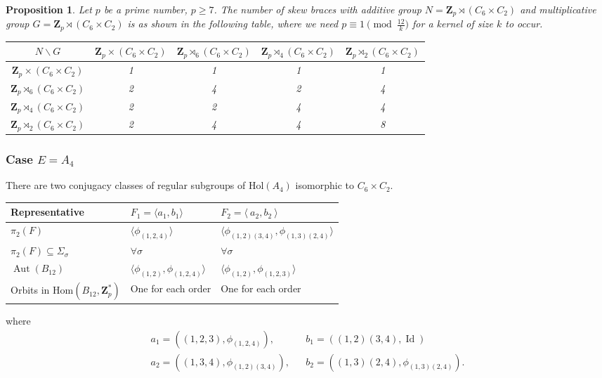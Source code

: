 \documentclass[12pt]{article}
\newtheorem{proposition}[theorem]{Proposition}
\theoremstyle{definition}
\newcommand{\Z}{\mathbf Z}
\newcommand{\Hol}{\mathrm{Hol}}
\newcommand{\Hom}{\mathrm{Hom}}
\newcommand{\Aut}{\operatorname{Aut}}
\newcommand{\Id}{\operatorname{Id}}
\begin{document}
\begin{proposition}
	Let $p$ be a prime number, $p\geq 7$. The number of skew braces with additive group $N=\Z_p \rtimes (C_{6}\times C_2)$ and multiplicative group $G=\Z_p\rtimes (C_6\times C_2)$ is as shown in the following table, where we need $p\equiv 1 \pmod{\frac {12}k}$ for a kernel of size $k$ to occur.
	
	\begin{center}
		\begin{tabular}{|c|c|c|c|c|}
			\hline
			$N \backslash G$ & $\Z_p\times (C_6\times C_2)$ & $\Z_p\rtimes_{6} (C_6\times C_2)$ & $\Z_p\rtimes_{4} (C_6\times C_2)$ & $\Z_p\rtimes_{2} (C_6\times C_2)$ \\
			\hline
			\hline
			$\Z_p\times (C_6\times C_2)$ &1&1&1&1\\
			\hline
			$\Z_p\rtimes_{6} (C_6\times C_2)$ &2&4&2&4\\
			\hline
			$\Z_p\rtimes_{4} (C_6\times C_2)$ &2&2&4&4\\
			\hline
			$\Z_p\rtimes_{2} (C_6\times C_2)$ &2&4&4&8\\
			\hline
			
		\end{tabular}
	\end{center}
\end{proposition}


\subsubsection*{Case $E=A_4$}

There are two conjugacy classes of regular subgroups of $\Hol(A_4)$ isomorphic to $C_6\times C_2$.  

\begin{center}
    \begin{tabular}{|l|l|l|}
    \hline
      Representative& $F_1=\langle a_1,b_1 \rangle$ & $F_2=\langle\  a_2,b_2 \ \rangle$ \\
      \hline
      $\pi_2(F)$ & $\langle \phi_{(1,2,4)}\rangle $ &$\langle \phi_{(1,2)(3,4)},\phi_{(1,3)(2,4)}\rangle$\\
      $\pi_2(F)\subseteq \Sigma_{\sigma}$ & $\forall \sigma$ &
      $\forall \sigma$ \\
      $\Aut(B_{12})$ &$\langle \phi_{(1,2)}, \phi_{(1,2,4)}\rangle$ &$\langle \phi_{(1,2)}, \phi_{(1,2,3)}\rangle$\\
      Orbits in $\Hom(B_{12},\Z_p^*)$ & One for each order & One for each order \\
      \hline
    \end{tabular}
\end{center}    
where 
$$\begin{array}{lcl}
a_1=((1,2,3),\phi_{(1,2,4)}),&& b_1=((1,2)(3,4),\Id) \\
a_2=((1,3,4),\phi_{(1,2)(3,4)}),&& b_2=((1,3)(2,4),\phi_{(1,3)(2,4)}).
\end{array}$$
\end{document}
